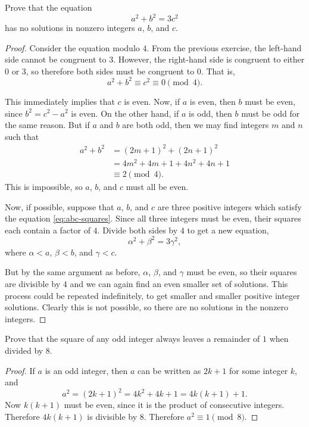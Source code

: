 Prove that the equation
\begin{equation}
  \label{eq:abc-squares}
  a^2 + b^2 = 3c^2
\end{equation}
has no solutions in nonzero integers $a$, $b$, and $c$.
\begin{proof}
  Consider the equation modulo $4$. From the previous exercise, the
  left-hand side cannot be congruent to $3$. However, the right-hand
  side is congruent to either $0$ or $3$, so therefore both sides must
  be congruent to $0$. That is,
  \begin{equation*}
    a^2 + b^2\equiv c^2\equiv0\pmod4.
  \end{equation*}

  This immediately implies that $c$ is even. Now, if $a$ is even, then
  $b$ must be even, since $b^2 = c^2-a^2$ is even. On the other hand,
  if $a$ is odd, then $b$ must be odd for the same reason. But if $a$
  and $b$ are both odd, then we may find integers $m$ and $n$ such
  that
  \begin{align*}
    a^2 + b^2 &= (2m+1)^2 + (2n+1)^2 \\
              &= 4m^2 + 4m + 1 + 4n^2 + 4n + 1 \\
              &\equiv 2\pmod4.
  \end{align*}
  This is impossible, so $a$, $b$, and $c$ must all be even.

  Now, if possible, suppose that $a$, $b$, and $c$ are three positive
  integers which satisfy the equation \eqref{eq:abc-squares}. Since
  all three integers must be even, their squares each contain a factor
  of $4$. Divide both sides by $4$ to get a new equation,
  \begin{equation*}
    \alpha^2 + \beta^2 = 3\gamma^2,
  \end{equation*}
  where $\alpha<a$, $\beta<b$, and $\gamma<c$.

  But by the same argument as before, $\alpha$, $\beta$, and $\gamma$
  must be even, so their squares are divisible by $4$ and we can again
  find an even smaller set of solutions. This process could be
  repeated indefinitely, to get smaller and smaller positive integer
  solutions. Clearly this is not possible, so there are no solutions
  in the nonzero integers.
\end{proof}

 Prove that the square of any odd integer always leaves a
remainder of $1$ when divided by $8$.
\begin{proof}
  If $a$ is an odd integer, then $a$ can be written as $2k + 1$ for
  some integer $k$, and
  \begin{equation*}
    a^2 = (2k + 1)^2 = 4k^2 + 4k + 1 = 4k(k + 1) + 1.
  \end{equation*}
  Now $k(k+1)$ must be even, since it is the product of consecutive
  integers. Therefore $4k(k+1)$ is divisible by $8$. Therefore
  $a^2\equiv1\pmod8$.
\end{proof}

